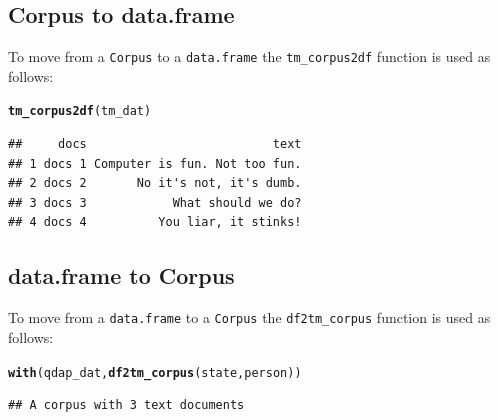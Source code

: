 \documentclass{article}\usepackage[]{graphicx}\usepackage[]{color}
\makeatletter
\newcommand{\hlstd}[1]{\textcolor[rgb]{0.345,0.345,0.345}{#1}}%
\newcommand{\hlkwd}[1]{\textcolor[rgb]{0.737,0.353,0.396}{\textbf{#1}}}%
\newenvironment{kframe}{%
 \def\at@end@of@kframe{}%
 \ifinner\ifhmode%
  \def\at@end@of@kframe{\end{minipage}}%
  \begin{minipage}{\columnwidth}%
 \fi\fi%
 \def\FrameCommand##1{\hskip\@totalleftmargin \hskip-\fboxsep
 \colorbox{shadecolor}{##1}\hskip-\fboxsep
     \hskip-\linewidth \hskip-\@totalleftmargin \hskip\columnwidth}%
 \MakeFramed {\advance\hsize-\width
   \@totalleftmargin\z@ \linewidth\hsize
   \@setminipage}}%
 {\par\unskip\endMakeFramed%
 \at@end@of@kframe}
\newenvironment{knitrout}{}{} %
\makeatother
\begin{document}

\subsection{Corpus to data.frame}

To move from a \texttt{Corpus} to a \texttt{data.frame} the \texttt{tm\_corpus2df} function is used as follows:

\begin{knitrout}
\color{fgcolor}\begin{kframe}
\begin{alltt}
\hlkwd{tm_corpus2df}\hlstd{(tm_dat)}
\end{alltt}
\end{kframe}
\end{knitrout}


\begin{knitrout}
\color{fgcolor}\begin{kframe}
\begin{verbatim}
##     docs                          text
## 1 docs 1 Computer is fun. Not too fun.
## 2 docs 2       No it's not, it's dumb.
## 3 docs 3            What should we do?
## 4 docs 4          You liar, it stinks!
\end{verbatim}
\end{kframe}
\end{knitrout}


\subsection{data.frame to Corpus}

To move from a \texttt{data.frame} to a \texttt{Corpus} the \texttt{df2tm\_corpus} function is used as follows:

\begin{knitrout}
\color{fgcolor}\begin{kframe}
\begin{alltt}
\hlkwd{with}\hlstd{(qdap_dat,} \hlkwd{df2tm_corpus}\hlstd{(state, person))}
\end{alltt}
\end{kframe}
\end{knitrout}


\begin{knitrout}
\color{fgcolor}\begin{kframe}
\begin{verbatim}
## A corpus with 3 text documents
\end{verbatim}
\end{kframe}
\end{knitrout}
\end{document}
